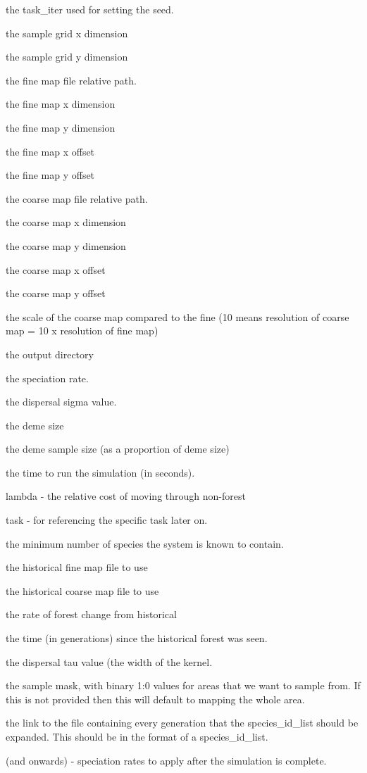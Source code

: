 \begin{DoxyEnumerate}
\item the task\+\_\+iter used for setting the seed.
\item the sample grid x dimension
\item the sample grid y dimension
\item the fine map file relative path.
\item the fine map x dimension
\item the fine map y dimension
\item the fine map x offset
\item the fine map y offset
\item the coarse map file relative path.
\item the coarse map x dimension
\item the coarse map y dimension
\item the coarse map x offset
\item the coarse map y offset
\item the scale of the coarse map compared to the fine (10 means resolution of coarse map = 10 x resolution of fine map)
\item the output directory
\item the speciation rate.
\item the dispersal sigma value.
\item the deme size
\item the deme sample size (as a proportion of deme size)
\item the time to run the simulation (in seconds).
\item lambda -\/ the relative cost of moving through non-\/forest
\item task -\/ for referencing the specific task later on.
\item the minimum number of species the system is known to contain.
\item the historical fine map file to use
\item the historical coarse map file to use
\item the rate of forest change from historical
\item the time (in generations) since the historical forest was seen.
\item the dispersal tau value (the width of the kernel.
\item the sample mask, with binary 1\+:0 values for areas that we want to sample from. If this is not provided then this will default to mapping the whole area.
\item the link to the file containing every generation that the species\+\_\+id\+\_\+list should be expanded. This should be in the format of a species\+\_\+id\+\_\+list.
\item (and onwards) -\/ speciation rates to apply after the simulation is complete.
\end{DoxyEnumerate}

